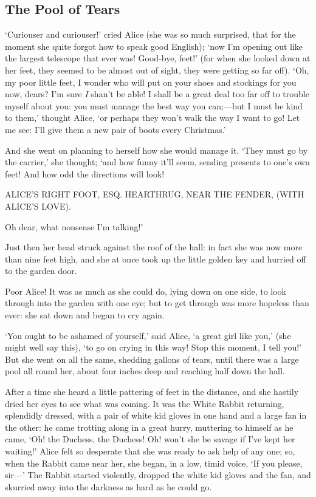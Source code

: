 \documentclass[12pt]{article}
\begin{document}
\begin{Parallel}[p]{}{}
{\section{The Pool of Tears}

‘Curiouser and curiouser!’ cried Alice (she was so much surprised, that for the moment she quite forgot how to speak good English); ‘now I’m opening out like the largest telescope that ever was! Good-bye, feet!’ (for when she looked down at her feet, they seemed to be almost out of sight, they were getting so far off). ‘Oh, my poor little feet, I wonder who will put on your shoes and stockings for you now, dears? I’m sure \textit{I} shan’t be able! I shall be a great deal too far off to trouble myself about you: you must manage the best way you can;—but I must be kind to them,’ thought Alice, ‘or perhaps they won’t walk the way I want to go! Let me see: I’ll give them a new pair of boots every Christmas.’

And she went on planning to herself how she would manage it. ‘They must go by the carrier,’ she thought; ‘and how funny it’ll seem, sending presents to one’s own feet! And how odd the directions will look!

     ALICE’S RIGHT FOOT, ESQ.
       HEARTHRUG,
         NEAR THE FENDER,
           (WITH ALICE’S LOVE).

Oh dear, what nonsense I’m talking!’

Just then her head struck against the roof of the hall: in fact she was now more than nine feet high, and she at once took up the little golden key and hurried off to the garden door.

Poor Alice! It was as much as she could do, lying down on one side, to look through into the garden with one eye; but to get through was more hopeless than ever: she sat down and began to cry again.

‘You ought to be ashamed of yourself,’ said Alice, ‘a great girl like you,’ (she might well say this), ‘to go on crying in this way! Stop this moment, I tell you!’ But she went on all the same, shedding gallons of tears, until there was a large pool all round her, about four inches deep and reaching half down the hall.

After a time she heard a little pattering of feet in the distance, and she hastily dried her eyes to see what was coming. It was the White Rabbit returning, splendidly dressed, with a pair of white kid gloves in one hand and a large fan in the other: he came trotting along in a great hurry, muttering to himself as he came, ‘Oh! the Duchess, the Duchess! Oh! won’t she be savage if I’ve kept her waiting!’ Alice felt so desperate that she was ready to ask help of any one; so, when the Rabbit came near her, she began, in a low, timid voice, ‘If you please, sir—’ The Rabbit started violently, dropped the white kid gloves and the fan, and skurried away into the darkness as hard as he could go.

}
\end{Parallel}
\end{document}
